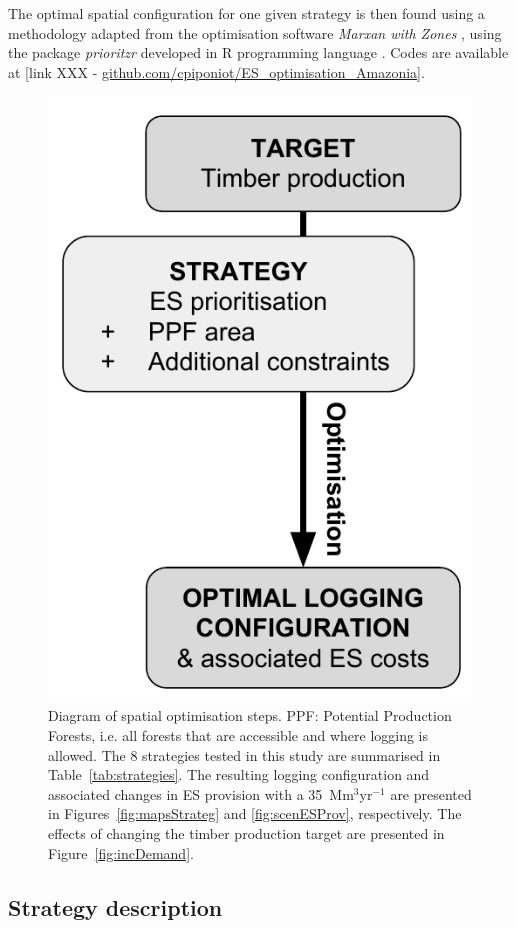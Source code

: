 \documentclass{article}
\begin{document}
The optimal spatial configuration for one given strategy is then found using a methodology adapted from the optimisation software \textit{Marxan with Zones} \cite{Watts2009}, using the package \textit{prioritzr} \cite{Hanson2018} developed in R programming language \cite{RCoreTeam2017}. Codes are available at [link XXX - \url{github.com/cpiponiot/ES_optimisation_Amazonia}]. 

\begin{figure}
    \centering
    \includegraphics[width = 0.6\linewidth]{graphs/diagramSpatOptim}
    \caption{Diagram of spatial optimisation steps. PPF: Potential Production Forests, i.e. all forests that are accessible and where logging is allowed. The 8 strategies tested in this study are summarised in Table~\ref{tab:strategies}. The resulting logging configuration and associated changes in ES provision with a 35~Mm$^3$yr$^{-1}$ are presented in Figures~\ref{fig:mapsStrateg} and \ref{fig:scenESProv}, respectively. The effects of changing the timber production target are presented in Figure~\ref{fig:incDemand}.}
    \label{fig:basicDiagram}
\end{figure}

\subsection{Strategy description}
\end{document}
